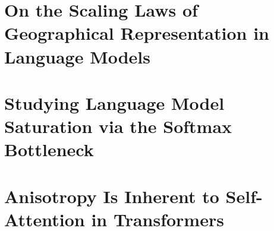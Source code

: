 
\chapter{On the Scaling Laws of Geographical Representation in Language Models}
\label{chap:geobias}


\chapter{Studying Language Model Saturation via the Softmax Bottleneck}
\label{chap:softmax_bottleneck}


\chapter{Anisotropy Is Inherent to Self-Attention in Transformers}


\label{chap:anisotropy}


% 
% 
% 
